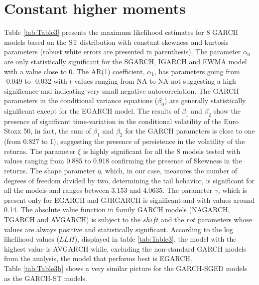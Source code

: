 \documentclass[a4paper, twoside]{templates/ociamthesis}
\begin{document}
\newpage

\hypertarget{constant-higher-moments}{%
\section{Constant higher moments}\label{constant-higher-moments}}

\noindent Table \ref{tab:Table3} presents the maximum likelihood estimates for 8 GARCH models based on the ST distribution with constant skewness and kurtosis parameters (robust white errors are presented in parenthesis). The parameter \(\alpha_0\) are only statistically significant for the SGARCH, IGARCH and EWMA model with a value close to 0. The AR(1) coefficient, \(\alpha_1\), has parameters going from -0.049 to -0.032 with \(t\) values ranging from NA to NA not suggesting a high significance and indicating very small negative autocorrelation. The GARCH parameters in the conditional variance equations (\(\beta_0\)) are generally statistically significant except for the EGARCH model. The results of \(\beta_1\) and \(\beta_2\) show the presence of significant time-variation in the conditional volatility of the Euro Stoxx 50, in fact, the sum of \(\beta_1\) and \(\beta_2\) for the GARCH parameters is close to one (from 0.827 to 1), suggesting the presence of persistence in the volatility of the returns. The parameter \(\xi\) is highly significant for all the 8 models tested with values ranging from 0.885 to 0.918 confirming the presence of Skewness in the returns. The shape parameter \(\eta\), which, in our case, measures the number of degrees of freedom divided by two, determining the tail behavior, is significant for all the models and ranges between 3.153 and 4.0635. The parameter \(\gamma\), which is present only for EGARCH and GJRGARCH is significant and with values around 0.14. The absolute value function in family GARCH models (NAGARCH, TGARCH and AVGARCH) is subject to the \(shift\) and the \(rot\) parameters whose values are always positive and statistically significant. According to the log likelihood values (\(LLH\)), displayed in table \ref{tab:Table3}, the model with the highest value is AVGARCH while, excluding the non-standard GARCH models from the analysis, the model that performs best is EGARCH.~\\

\noindent Table \ref{tab:Table3b} shows a very similar picture for the GARCH-SGED models as the GARCH-ST models.
\end{document}
